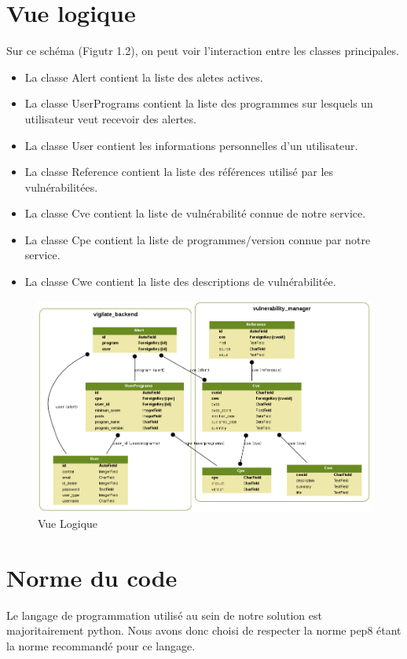 \section{Vue logique}
Sur ce schéma (Figutr 1.2), on peut voir l’interaction entre les classes principales.\\
\begin{itemize}
\item La classe Alert contient la liste des aletes actives.
\item La classe UserPrograms contient la liste des programmes sur lesquels un utilisateur veut recevoir des alertes.
\item La classe User contient les informations personnelles d’un utilisateur.
\item La classe Reference contient la liste des références utilisé par les vulnérabilitées.
\item La classe Cve contient la liste de vulnérabilité connue de notre service.
\item La classe Cpe contient la liste de programmes/version connue par notre service.
\item La classe Cwe contient la liste des descriptions de vulnérabilitée.

\end{itemize}

\begin{figure}[H]
  \centering
  \includegraphics[width=16cm]{django_class.png}
  \vspace*{0.5cm}
  \caption{Vue Logique}
  \vspace*{1cm}
\end{figure}


\section{Norme du code}
Le langage de programmation utilisé au sein de notre solution est majoritairement python. Nous avons donc choisi de respecter la norme pep8 étant la norme recommandé pour ce langage.

